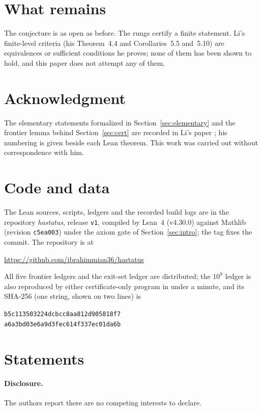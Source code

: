 \documentclass[11pt]{article}
\theoremstyle{plain}
\theoremstyle{definition}
\begin{document}
\section{What remains}
\label{sec:remains}

The conjecture is as open as before. The rungs certify a finite statement. Li's finite-level criteria (his Theorem~4.4 and Corollaries~5.5 and~5.10) are equivalences or sufficient conditions he proves; none of them has been shown to hold, and this paper does not attempt any of them.


\section*{Acknowledgment}
The elementary statements formalized in Section~\ref{sec:elementary} and the frontier lemma behind Section~\ref{sec:cert} are recorded in Li's paper \cite{Li26}; his numbering is given beside each Lean theorem. This work was carried out without correspondence with him.

\section*{Code and data}
The Lean sources, scripts, ledgers and the recorded build logs are in the repository \emph{hastatus}, release \texttt{v1}, compiled by Lean~4 (v4.30.0) against Mathlib (revision \texttt{c5ea003}) under the axiom gate of Section~\ref{sec:intro}; the tag fixes the commit. The repository is at
\begin{center}\url{https://github.com/ibrahimmian36/hastatus}\end{center}
\begin{samepage}
All five frontier ledgers and the exit-set ledger are distributed; the $10^9$ ledger is also reproduced by either certificate-only program in under a minute, and its SHA-256 (one string, shown on two lines) is
\begin{center}\small
\texttt{b5c113503224dcbcc8aa812d905818f7}\\
\texttt{a6a3bd03e6a9d3fec614f337ec01da6b}
\end{center}
\end{samepage}

\section*{Statements}
\paragraph{Disclosure.} The authors report there are no competing interests to declare.
\end{document}
